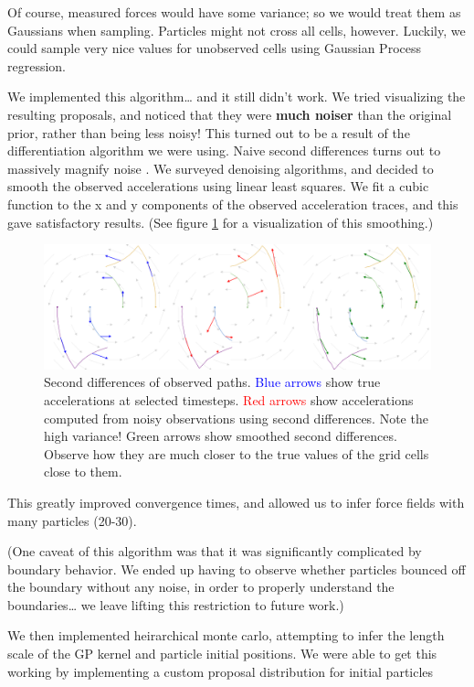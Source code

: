 \documentclass[11pt]{article}
\begin{document}
Of course, measured forces would have some variance; so we would treat them as Gaussians when sampling. Particles might not cross all cells, however. Luckily, we could sample very nice values for unobserved cells using Gaussian Process regression.

We implemented this algorithm\ldots{} and it still didn't work. We tried visualizing the resulting proposals, and noticed that they were \textbf{much noiser} than the original prior, rather than being less noisy! This  turned out to be a result of the differentiation algorithm we were using. Naive second differences turns out to massively magnify noise \citep{NumDiffNonsmooth}. We surveyed denoising algorithms, and decided to smooth the observed accelerations using linear least squares. We fit a cubic function to the x and y components of the observed acceleration traces, and this gave satisfactory results. (See figure \ref{fig:obsall} for a visualization of this smoothing.)

\begin{figure}[htbp]
\centering
\includegraphics[width=6in]{./obsall.png}
\caption{\label{fig:obsall}Second differences of observed paths. \textcolor{blue}{Blue arrows} show true accelerations at selected timesteps. \textcolor{red}{Red arrows} show accelerations computed from noisy observations using second differences. Note the high variance! \textcolor{goodgreen}{Green arrows} show smoothed second differences. Observe how they are much closer to the true values of the grid cells close to them.}
\end{figure}

This greatly improved convergence times, and allowed us to infer force fields with many particles (20-30).

(One caveat of this algorithm was that it was significantly complicated by boundary behavior. We ended up having to observe whether particles bounced off the boundary without any noise, in order to properly understand the boundaries\ldots{} we leave lifting this restriction to future work.)

We then implemented heirarchical monte carlo, attempting to infer the length scale of the GP kernel and particle initial positions. We were able to get this working by implementing a custom proposal distribution for initial particles
\end{document}
